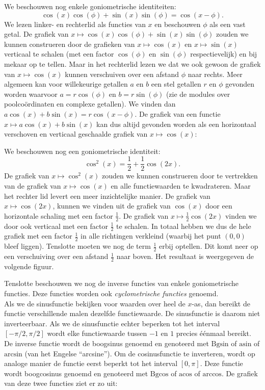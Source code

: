 \documentclass{ximera}
\begin{document}
We beschouwen nog enkele goniometrische identiteiten:
\[
\cos(x)\cos(\phi)+\sin(x)\sin(\phi)=\cos(x-\phi).
\]
We lezen linker- en rechterlid als functies van $x$ en
beschouwen $\phi$ als een vast getal. De grafiek van $x\mapsto
\cos(x)\cos(\phi)+\sin(x)\sin(\phi)$ zouden we kunnen construeren door
de grafieken van $x\mapsto\cos(x)$ en $x\mapsto\sin(x)$ verticaal te
schalen (met een factor $\cos(\phi)$ en $\sin(\phi)$
respectievelijk) en bij mekaar op te tellen. Maar in het rechterlid
lezen we dat we ook gewoon de grafiek van $x\mapsto\cos(x)$ kunnen
verschuiven over een afstand $\phi$ naar rechts.
Meer algemeen kan voor willekeurige getallen $a$ en $b$ een stel
getallen $r$ en $\phi$ gevonden worden waarvoor $a=r\cos(\phi)$ en
$b=r\sin(\phi)$ (zie de modules over poolco\"ordinaten en complexe
getallen). We vinden dan $a\cos(x)+b\sin(x)=r\cos(x-\phi)$. De grafiek
van een functie $x\mapsto a\cos(x)+b\sin(x)$ kan dus altijd gevonden
worden als een horizontaal verschoven en verticaal geschaalde grafiek
van $x\mapsto\cos(x)$:


\newpage

We beschouwen nog een goniometrische identiteit:
\[
\cos^2(x)=\frac{1}{2}+\frac{1}{2}\cos(2x).
\]
De grafiek van $x\mapsto\cos^2(x)$ zouden we kunnen construeren door te
vertrekken van de grafiek van $x\mapsto\cos(x)$ en alle functiewaarden te
kwadrateren. Maar het rechter lid levert een meer inzichtelijke
manier. De grafiek van $x\mapsto\cos(2x)$, kunnen we vinden uit de grafiek van
$\cos(x)$ door een horizontale schaling met een factor
$\frac{1}{2}$. De grafiek van $x\mapsto\frac{1}{2}\cos(2x)$ vinden we door ook
verticaal met een factor $\frac{1}{2}$ te schalen. In totaal hebben
we dus de hele grafiek met een factor $\frac{1}{2}$ in alle richtingen
verkleind (waarbij het punt $(0,0)$ bleef liggen). Tenslotte moeten we
nog de term $\frac{1}{2}$ erbij optellen. Dit komt neer op een
verschuiving over een afstand $\frac{1}{2}$ naar boven. Het resultaat
is weergegeven de volgende figuur.


Tenslotte beschouwen we nog de inverse functies van enkele
goniometrische functies. Deze functies worden ook {\em cyclometrische
functies} genoemd.\\
Als we de sinusfunctie bekijken voor waarden over heel de $x$-as, dan
bereikt de functie verschillende malen dezelfde functiewaarde. De
sinusfunctie is daarom niet inverteerbaar. Als we de sinusfunctie
echter beperken tot het interval $[-\pi/2,\pi/2]$ wordt elke
functiewaarde tussen $-1$ en $1$ precies \'e\'enmaal bereikt. De
inverse functie wordt de boogsinus genoemd en genoteerd met
$\mbox{Bgsin}$ of $\mbox{asin}$ of $\mbox{arcsin}$ (van het Engelse
``arcsine''). 
Om de cosinusfunctie te inverteren, wordt op analoge manier de functie
eerst beperkt tot het interval $[0,\pi]$. Deze functie wordt
boogcosinus genoemd en genoteerd met $\mbox{Bgcos}$ of $\mbox{acos}$
of $\mbox{arccos}$. De grafiek van deze twee functies ziet er zo uit:
\end{document}
